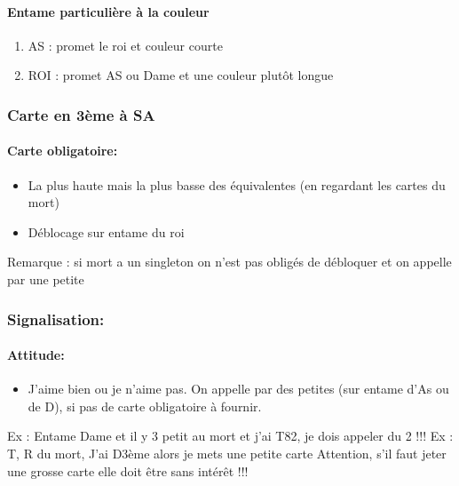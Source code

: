 \documentclass[a4paper]{article}
\begin{document}
\paragraph{Entame particulière à la couleur}

\begin{enumerate}
\item AS : promet le roi et couleur courte

\item ROI : promet AS ou Dame et une couleur plutôt longue

\end{enumerate}

\subsubsection{Carte en 3ème à SA}

\paragraph{Carte obligatoire:}

\begin{itemize}
\item La plus haute mais la plus basse des équivalentes (en regardant les cartes du mort)

\item Déblocage sur entame du roi

\end{itemize}

Remarque : si mort a un singleton on n’est pas obligés de débloquer et on appelle par une petite

\subsubsection{Signalisation:}

\paragraph{Attitude:}

\begin{itemize}
\item J’aime bien ou je n’aime pas. On appelle par des petites (sur entame d’As ou de D), si pas de carte obligatoire à fournir.

\end{itemize}

Ex : Entame Dame et il y 3 petit au mort et j’ai T82, je dois appeler du 2 !!!
Ex : T, R du mort, J’ai D3ème alors je mets une petite carte
Attention, s’il faut jeter une grosse carte elle doit être sans intérêt !!!
\end{document}
